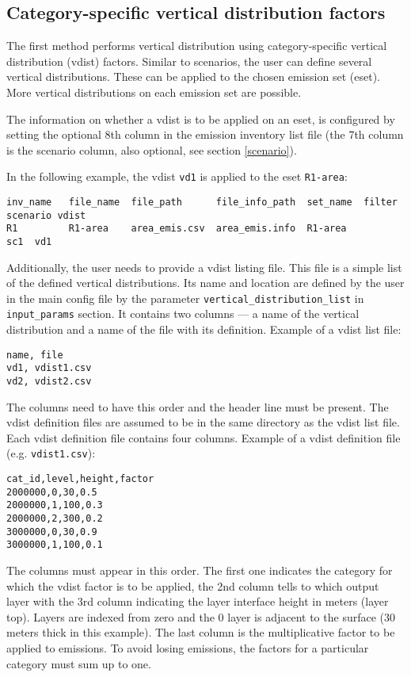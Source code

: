 \documentclass[a4paper,11pt]{article}
\begin{document}
\subsection{Category-specific vertical distribution factors}
The first method performs vertical distribution using category-specific
vertical distribution (vdist) factors. Similar to scenarios, the user can define several vertical distributions. These can be applied to the chosen emission set (eset). More vertical distributions on each emission set are possible.

The information on whether a vdist is to be applied on an eset, is configured by setting the optional 8th column in the emission inventory list file (the 7th column is the scenario column, also optional, see section \ref{scenario}).

In the following example, the vdist \verb|vd1| is applied to the eset \verb|R1-area|:
\begin{verbatim}
inv_name   file_name  file_path      file_info_path  set_name  filter  scenario	vdist
R1         R1-area    area_emis.csv  area_emis.info  R1-area           sc1	vd1
\end{verbatim}

Additionally, the user needs to provide a vdist listing file. This file is a simple list of the defined vertical distributions. Its name and location are defined by the user in the main config file by the parameter \verb|vertical_distribution_list| in \verb|input_params| section. It contains two columns --- a name of the vertical distribution and a name of the file with its definition. Example of a vdist list file:
\begin{verbatim}
name, file
vd1, vdist1.csv
vd2, vdist2.csv
\end{verbatim}

The columns need to have this order and the header line must be present. The vdist definition files are assumed to be in the same directory as the vdist list file. Each vdist definition file contains four columns. Example of a vdist definition file (e.g. \verb|vdist1.csv|):

\begin{verbatim}
cat_id,level,height,factor
2000000,0,30,0.5
2000000,1,100,0.3
2000000,2,300,0.2
3000000,0,30,0.9
3000000,1,100,0.1
\end{verbatim}

The columns must appear in this order. The first one indicates the category for which the vdist factor is to be applied, the 2nd column tells to which output layer with the 3rd column indicating the layer interface height in meters (layer top). Layers are indexed from zero and the 0 layer is adjacent to the surface (30 meters thick in this example). The last column is the multiplicative factor to be applied to emissions. To avoid losing emissions, the factors for a particular category must sum up to one.
\end{document}
